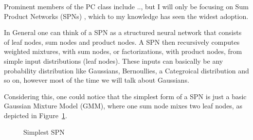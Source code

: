 Prominent members of the PC class include .., but I will only be focusing on Sum Product Networks (SPNs) \cite{spn}, which to my 
knowledge has seen the widest adoption. 

In General one can think of a SPN as a structured neural network that consists of leaf nodes, sum nodes and product 
nodes. A SPN then recursively computes weighted mixtures, with sum nodes, or factorizations, with product nodes, from simple input distributions (leaf nodes). 
These inputs can basically be any probability distribution like Gaussians, Bernoullies, a Categroical distribution and so on,
however most of the time we will talk about Gaussians.

Considering this, one could notice that the simplest form of a SPN is just a basic 
Gaussian Mixture Model (GMM), where one sum node mixes two leaf nodes, as depicted in Figure~\ref{fig:spn_gmm}.

\begin{figure}[h!]
    \centering
    \caption{Simplest SPN}
    \label{fig:spn_gmm}
\end{figure}

